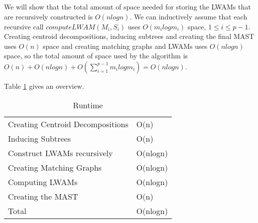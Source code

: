 \subsection{}
We will show that the total amount of space needed for storing the LWAMs that are recursively constructed is $O(nlogn)$. We can inductively assume that each recursive call $computeLWAM(M_i, S_i)$ uses $O(m_ilogm_i)$ space, $1 \le i \le p-1$. Creating centroid decompositions, inducing subtrees and creating the final MAST uses $O(n)$ space and creating matching graphs and LWAMs uses $O(nlogn)$ space, so the total amount of space used by the algorithm is $O(n) + O(nlogn) + O(\sum_{i=1}^{p-1} m_ilogm_i) = O(nlogn)$.

Table \ref{spaceTable} gives an overview.
\begin{table}[]
	\centering
	\begin{tabular}{l|l}
		Creating Centroid Decompositions & O(n)     \\
		Inducing Subtrees                & O(n)     \\
		Construct LWAMs recursively		 & O(nlogn) \\
		Creating Matching Graphs         & O(nlogn) \\
		Computing LWAMs                  & O(nlogn) \\
		Creating the MAST                & O(n)     \\ \hline
		Total                            & O(nlogn)
	\end{tabular}
	\caption{Runtime}
	\label{spaceTable}
\end{table}






